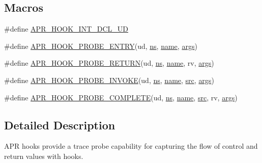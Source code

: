 \subsection*{Macros}
\begin{DoxyCompactItemize}
\item 
\#define \hyperlink{group__apr__hook__probes_ga258d03fb4cf228fcb9d2fa094625ffaf}{A\+P\+R\+\_\+\+H\+O\+O\+K\+\_\+\+I\+N\+T\+\_\+\+D\+C\+L\+\_\+\+UD}
\item 
\#define \hyperlink{group__apr__hook__probes_ga320422eebccc41f9329e34e11939e302}{A\+P\+R\+\_\+\+H\+O\+O\+K\+\_\+\+P\+R\+O\+B\+E\+\_\+\+E\+N\+T\+RY}(ud,  \hyperlink{group__APR__Util__RC_ga16ebca092e717a050cdb4feb7bb59849}{ns},  \hyperlink{pcre_8txt_a5a15d68aadb41c771fe50a27c400d49b}{name},  \hyperlink{group__APR__Util__DBD_ga6b6dfca544bdc17e0e73e3ca56c2363d}{args})
\item 
\#define \hyperlink{group__apr__hook__probes_gab3017efe0bb66b97b6b7931245211692}{A\+P\+R\+\_\+\+H\+O\+O\+K\+\_\+\+P\+R\+O\+B\+E\+\_\+\+R\+E\+T\+U\+RN}(ud,  \hyperlink{group__APR__Util__RC_ga16ebca092e717a050cdb4feb7bb59849}{ns},  \hyperlink{pcre_8txt_a5a15d68aadb41c771fe50a27c400d49b}{name},  rv,  \hyperlink{group__APR__Util__DBD_ga6b6dfca544bdc17e0e73e3ca56c2363d}{args})
\item 
\#define \hyperlink{group__apr__hook__probes_ga030df3d86fe087857b32388e01ad3928}{A\+P\+R\+\_\+\+H\+O\+O\+K\+\_\+\+P\+R\+O\+B\+E\+\_\+\+I\+N\+V\+O\+KE}(ud,  \hyperlink{group__APR__Util__RC_ga16ebca092e717a050cdb4feb7bb59849}{ns},  \hyperlink{pcre_8txt_a5a15d68aadb41c771fe50a27c400d49b}{name},  \hyperlink{apr__siphash_8h_ab3b4066b211a3d1de8f72e90b2bca8ab}{src},  \hyperlink{group__APR__Util__DBD_ga6b6dfca544bdc17e0e73e3ca56c2363d}{args})
\item 
\#define \hyperlink{group__apr__hook__probes_ga5793578cb2da7815b20b9a87c281ed7c}{A\+P\+R\+\_\+\+H\+O\+O\+K\+\_\+\+P\+R\+O\+B\+E\+\_\+\+C\+O\+M\+P\+L\+E\+TE}(ud,  \hyperlink{group__APR__Util__RC_ga16ebca092e717a050cdb4feb7bb59849}{ns},  \hyperlink{pcre_8txt_a5a15d68aadb41c771fe50a27c400d49b}{name},  \hyperlink{apr__siphash_8h_ab3b4066b211a3d1de8f72e90b2bca8ab}{src},  rv,  \hyperlink{group__APR__Util__DBD_ga6b6dfca544bdc17e0e73e3ca56c2363d}{args})
\end{DoxyCompactItemize}


\subsection{Detailed Description}
A\+PR hooks provide a trace probe capability for capturing the flow of control and return values with hooks.

